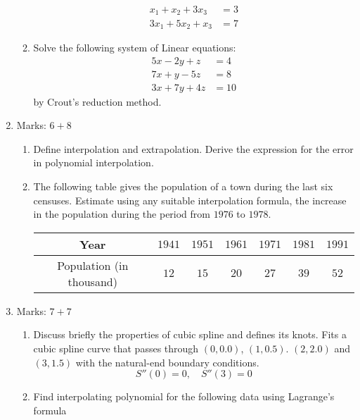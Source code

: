 \documentclass[12pt,class=book,crop=false]{standalone}
\begin{document}
\begin{enumerate}
\begin{enumerate}
\begin{align*}
            x_1 + x_2 + 3x_3 &= 3\\
            3x_1+ 5x_2 + x_3 &=7
        \end{align*}
        \item Solve the following system of Linear equations:
        \begin{align*}
            5x - 2y + z &= 4\\
            7x + y - 5z &= 8\\
            3x + 7y+4z &= 10
        \end{align*}
        by Crout's reduction method.
    \end{enumerate}
    \item Marks: $ 6+8 $
    \begin{enumerate}
        \item Define interpolation and extrapolation. Derive the expression for the error in polynomial interpolation.
        \item The following table gives the population of a town during the last six censuses. Estimate using any suitable interpolation formula, the increase in the population during the period from $ 1976 $ to $ 1978 $.
        \begin{table}[H]
            \centering
            \begin{tabular}{|c|c|c|c|c|c|c|}
                \hline
                Year& $ 1941 $& $ 1951 $& $ 1961 $& $ 1971 $& $ 1981 $& $ 1991 $\\\hline               
                Population (in thousand)& $ 12 $&$ 15 $&$ 20 $&$ 27 $&$ 39 $&$ 52 $\\\hline
            \end{tabular}
        \end{table}
    \end{enumerate}
    \item Marks: $ 7+7 $
    \begin{enumerate}
        \item Discuss briefly the properties of cubic spline and defines its knots. Fits a cubic spline curve that passes through $ (0, 0.0) $, $ (1, 0.5) $. $ (2,2.0) $ and $ (3,1.5) $ with the natural-end boundary conditions.
        \[
            S''(0) = 0,\quad S''(3) = 0
        \]
        \item Find interpolating polynomial for the following data using Lagrange's formula
        \begin{table}[H]
            \centering
            \begin{tabular}{|c|c|c|c|}

\end{tabular}
\end{table}
\end{enumerate}
\end{enumerate}
\end{document}
